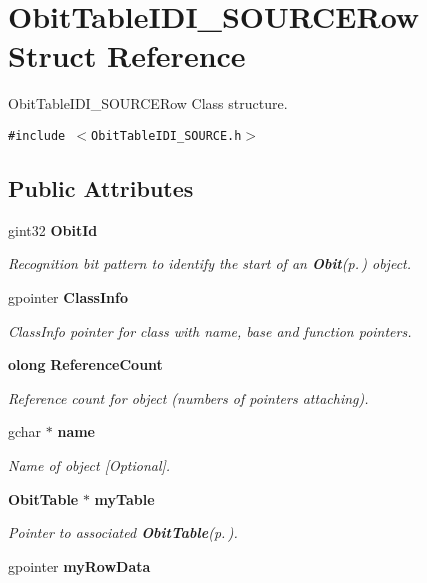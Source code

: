 \section{Obit\-Table\-IDI\_\-SOURCERow Struct Reference}
\label{structObitTableIDI__SOURCERow}
Obit\-Table\-IDI\_\-SOURCERow Class structure.  


{\tt \#include $<$Obit\-Table\-IDI\_\-SOURCE.h$>$}

\subsection*{Public Attributes}
\begin{CompactItemize}
\item 
gint32 {\bf Obit\-Id}
\begin{CompactList}\small\item\em Recognition bit pattern to identify the start of an {\bf Obit}{\rm (p.\,\pageref{structObit})} object. \item\end{CompactList}\item 
gpointer {\bf Class\-Info}
\begin{CompactList}\small\item\em Class\-Info pointer for class with name, base and function pointers. \item\end{CompactList}\item 
{\bf olong} {\bf Reference\-Count}
\begin{CompactList}\small\item\em Reference count for object (numbers of pointers attaching). \item\end{CompactList}\item 
gchar $\ast$ {\bf name}
\begin{CompactList}\small\item\em Name of object [Optional]. \item\end{CompactList}\item 
{\bf Obit\-Table} $\ast$ {\bf my\-Table}
\begin{CompactList}\small\item\em Pointer to associated {\bf Obit\-Table}{\rm (p.\,\pageref{structObitTable})}. \item\end{CompactList}\item 
gpointer {\bf my\-Row\-Data}

\end{CompactItemize}
